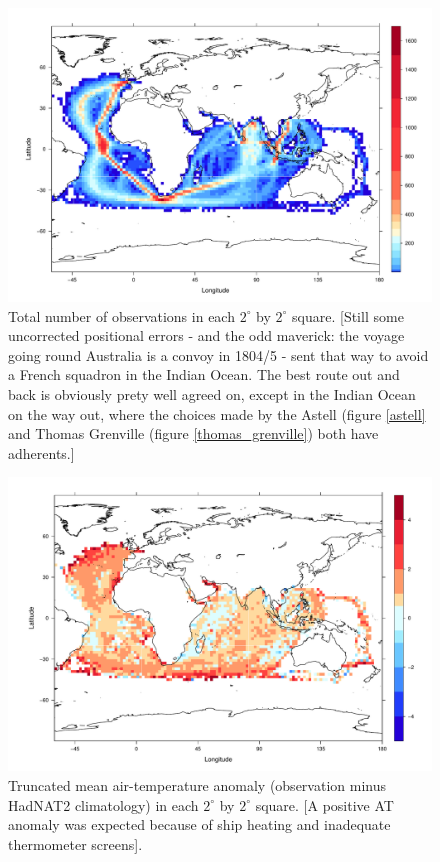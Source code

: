 \documentclass[a4paper,11pt]{article}
\begin{document}
\begin{figure}
\begin{center}
\includegraphics[angle=0, width=1.0\textwidth]{../coverage_map/coverage}
\caption{Total number of observations in each $2^\circ$ by $2^\circ$ square. [Still some uncorrected positional errors - and the odd maverick: the voyage going round Australia is a convoy in 1804/5 - sent that way to avoid a French squadron in the Indian Ocean. The best route out and back is obviously prety well agreed on, except in the Indian Ocean on the way out, where the choices made by the Astell (figure \ref{astell} and Thomas Grenville (figure \ref{thomas_grenville}) both have adherents.]}
\label{coverage}
\end{center}
\end{figure}

\clearpage

\begin{figure}
\begin{center}
\includegraphics[angle=0, width=1.0\textwidth]{../anomaly_map/at_anomaly}
\caption{Truncated mean air-temperature anomaly (observation minus HadNAT2 climatology) in each $2^\circ$ by $2^\circ$ square. [A positive AT anomaly was expected because of ship heating and inadequate thermometer screens].}
\label{at_anomaly}
\end{center}
\end{figure}
\end{document}

